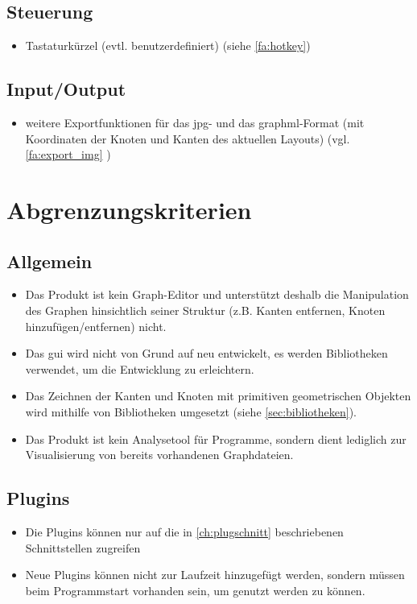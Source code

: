 \subsection{Steuerung}
  \begin{itemize}
    \item Tastaturkürzel (evtl. benutzerdefiniert) (siehe \ref{fa:hotkey})
  \end{itemize}

\subsection{Input/Output}
  \begin{itemize}
    \item weitere Exportfunktionen für das \gls{jpg}- und das \gls{graphml}-Format (mit Koordinaten der Knoten und Kanten des aktuellen Layouts) (vgl. \ref{fa:export_img} )
  \end{itemize}
  
\section{Abgrenzungskriterien}

\subsection{Allgemein}
  \begin{itemize}
    \item Das Produkt ist kein Graph-Editor und unterstützt deshalb die Manipulation des Graphen hinsichtlich seiner Struktur (z.B. Kanten entfernen, Knoten hinzufügen/entfernen) nicht.
    \item Das \gls{gui} wird nicht von Grund auf neu entwickelt, es werden Bibliotheken verwendet, um die Entwicklung zu erleichtern.
    \item Das Zeichnen der Kanten und Knoten mit primitiven geometrischen Objekten wird mithilfe von Bibliotheken umgesetzt (siehe \autoref{sec:bibliotheken}).
    \item Das Produkt ist kein Analysetool für Programme, sondern dient lediglich zur Visualisierung von bereits vorhandenen Graphdateien.
  \end{itemize}
\subsection{Plugins}
  \begin{itemize}
    \item Die Plugins können nur auf die in \autoref{ch:plugschnitt} beschriebenen Schnittstellen zugreifen
    \item Neue Plugins können nicht zur Laufzeit hinzugefügt werden, sondern müssen beim Programmstart vorhanden sein, um genutzt werden zu können.
  \end{itemize}
